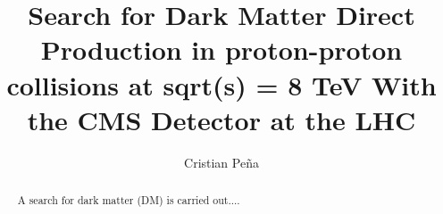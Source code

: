 \documentclass[draftfoot,preprint]{cit_thesis}
\begin{document}
\title{Search for Dark Matter Direct Production in proton-proton collisions at sqrt(s) = 8 TeV With the CMS Detector at the LHC}
\author{Cristian Pe\~na}

\maketitle

\begin{abstract}
A search for dark matter (DM) is carried out....
\end{abstract}








\end{document}
